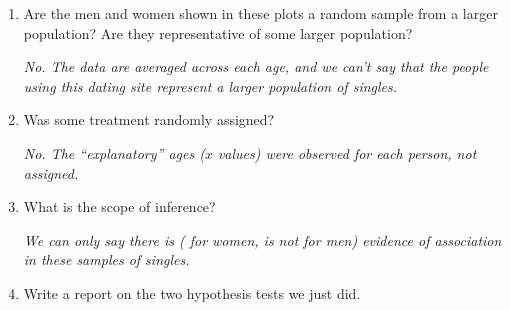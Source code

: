 \begin{enumerate}
\begin{enumerate}
\begin{key}
  {\it At the $\alpha = 0.05$ significance level we  reject
    $H_0$, We have super strong evidence that the true slope between
    women's age and the age of man they find most attractive is
    greater than zero.  In other words: There is a very strong positive
    association between the two variables which is significant at
    the 0.05 level.}
\end{key}

 
\item Switch from slope to correlation. What is the sample
  correlation, and what is the p-value for a test of $H_0:\ \rho=0$
  versus $H_a:\ \rho > 0$?.
\begin{students}
 \vspace{1cm}      
\end{students}

\begin{key}
{\it $r = 0.982$ and the p-value is the same.}
\end{key}
  \end{enumerate}

  
\item Are the men and women shown in these plots a random sample from
  a larger population?  Are they representative of some larger population?
\begin{students}
 \vspace{2cm}      
\end{students}

\begin{key}
  {\it No.  The data are averaged across each age, and we can't say
    that the people using this dating site represent a larger
    population of singles.}
\end{key}

\item Was some  treatment  randomly assigned?
\begin{students}
 \vspace{1.5cm}      
\end{students}

\begin{key}
  {\it No.  The ``explanatory'' ages ($x$ values) were observed for
    each person, not assigned.} 
\end{key}

\item What is the scope of inference?
\begin{students}
 \vspace{1.5cm}      
\end{students}

\begin{key}
  {\it We can only say there is ( for women,  is not for men)
    evidence of association in these samples of singles.} 
\end{key}

\item Write a report on the two hypothesis tests we just did. \vfill
\end{enumerate}
 


